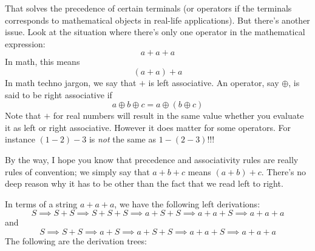 \begin{center}
\end{center}
That solves the precedence of certain terminals (or operators if the 
terminals corresponds to mathematical objects in real-life applications).
But there's another issue.
Look at the situation where there's only one operator in the mathematical
expression:
\[
a + a + a
\]
In math, this means
\[
(a + a) + a
\]
In math techno jargon, we say that $+$ is left associative.
An operator, say $\oplus$, is said to be right associative if
\[
a \oplus b \oplus c = a \oplus (b \oplus c)
\]
Note that $+$ for real numbers will result in the same value whether you
evaluate it as left or right associative.
However it does matter for some operators.
For instance $(1 - 2) - 3$ is \textit{ not} the same as $1 - (2 - 3)$!!!

By the way, I hope you know that precedence and 
associativity rules are really rules of
convention; we simply say that $a + b + c$ means $(a + b) + c$.
There's no deep reason why it has to be other than the fact that we read left 
to right.

In terms of a string $a + a + a$, we have the following left derivations:
\[
S
\implies S + S
\implies S + S + S
\implies a + S + S
\implies a + a + S
\implies a + a + a
\]
and
\[
S
\implies S + S
\implies a + S
\implies a + S + S
\implies a + a + S
\implies a + a + a
\]
The following are the derivation trees:


